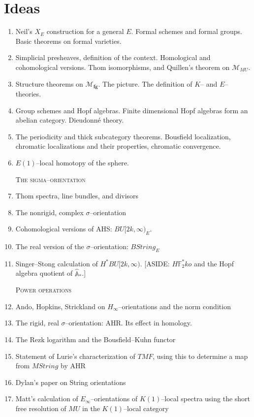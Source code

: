 \documentclass[12pt]{book}
\newcommand{\F}{\mathbb F}
\newcommand{\A}{\widehat{\mathbb{A}}}
\newcommand{\<}{\langle}
\renewcommand{\>}{\rangle}
\newcommand{\context}[1]{\mathcal{M}_{#1}}
\newcommand{\moduli}[1]{\mathcal{M}_{\mathbf{#1}}}
\newcommand{\String}{\mathit{String}}
\newcommand{\TMF}{\mathit{TMF}}
\newcommand{\MU}{\mathit{MU}}
\numberwithin{equation}{section}
\theoremstyle{plain}
\theoremstyle{definition}
\theoremstyle{remark}
\begin{document}
\section*{Ideas}
\begin{enumerate}

\item Neil's $X_E$ construction for a general $E$. Formal schemes and formal groups. Basic theorems on formal varieties.
\item Simplicial presheaves, definition of the context. Homological and cohomological versions. Thom isomorphisms, and Quillen's theorem on $\context{\MU}$.
\item Structure theorems on $\moduli{fg}$. The picture. The definition of $K$-- and $E$--theories.
\item Group schemes and Hopf algebras. Finite dimensional Hopf algebras form an abelian category. Dieudonn\'e theory.
\item The periodicity and thick subcategory theorems. Bousfield localization, chromatic localizations and their properties, chromatic convergence.
\item $E(1)$--local homotopy of the sphere.

\textsc{The sigma--orientation}

\item Thom spectra, line bundles, and divisors
\item The nonrigid, complex $\sigma$--orientation
\item Cohomological versions of AHS: $BU[2k, \infty)_E$.
\item The real version of the $\sigma$--orientation: $B\String_E$
\item Singer--Stong calculation of $H^* BU[2k, \infty)$. [ASIDE: $H\F_2^* ko$ and the Hopf algebra quotient of $\A_*$.]

\textsc{Power operations}

\item Ando, Hopkins, Strickland on $H_\infty$--orientations and the norm condition
\item The rigid, real $\sigma$--orientation: AHR. Its effect in homology.
\item The Rezk logarithm and the Bousfield--Kuhn functor
\item Statement of Lurie's characterization of $\TMF$, using this to determine a map from $M\String$ by AHR
\item Dylan's paper on String orientations
\item Matt's calculation of $E_\infty$--orientations of $K(1)$--local spectra using the short free resolution of $MU$ in the $K(1)$--local category


\end{enumerate}
\end{document}
